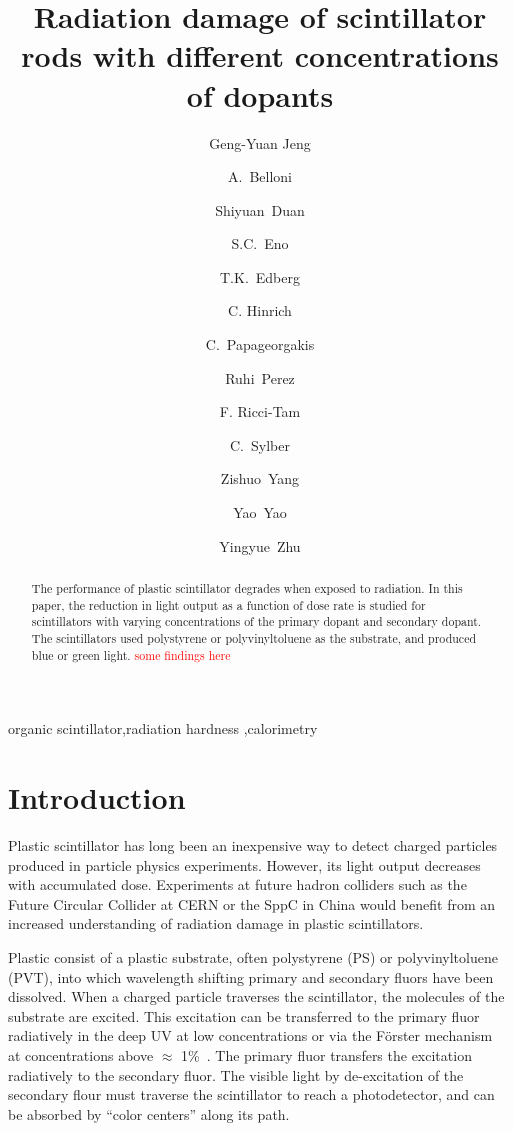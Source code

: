 \documentclass[review]{elsarticle}
\begin{document}
\begin{frontmatter}

\title{Radiation damage of scintillator rods with different concentrations of dopants
}


\author[umd]{Geng-Yuan Jeng}
\author[umd]{A.~Belloni}
\author[umd]{Shiyuan~Duan}
\author[umd]{S.C.~Eno}
\author[umd]{T.K.~Edberg}
\author[umd]{C. Hinrich}
\author[umd]{C.~Papageorgakis}
\author[umd]{Ruhi~Perez}
\author[umd]{F. Ricci-Tam}
\author[umd]{C.~Sylber}
\author[umd]{Zishuo~Yang}
\author[umd]{Yao~Yao}
\author[umd]{Yingyue~Zhu}

\address[umd]{Dept. Physics, U. Maryland, College Park MD 30742 USA}



\begin{abstract}
The performance of plastic scintillator degrades when exposed to radiation. 
In this paper, the reduction in light output  as a function of dose rate
is studied for scintillators
with varying concentrations of the primary dopant and secondary dopant.
The scintillators used polystyrene or polyvinyltoluene as the substrate, and
produced blue or green light. \textcolor{red}{some findings here}
\end{abstract}

\begin{keyword}
organic scintillator\sep radiation hardness \sep calorimetry
\end{keyword}

\end{frontmatter}

\linenumbers

\section{Introduction}
Plastic scintillator has long been an inexpensive way to detect 
charged particles produced in particle physics experiments.  
However, its 
light output decreases with accumulated dose.  
Experiments at future hadron colliders such as the Future Circular Collider at CERN\cite{fcc}
or the SppC in China\cite{sppc} would benefit from an increased understanding
of radiation damage in plastic scintillators.


Plastic consist of a plastic substrate, 
often polystyrene (PS) or polyvinyltoluene (PVT),
into which wavelength 
shifting primary and secondary fluors have been dissolved.
When a charged particle traverses the scintillator, the molecules of the substrate are excited.  
This excitation can be transferred to the primary fluor radiatively in the deep UV at low concentrations or via the F{\"o}rster 
mechanism~\cite{forster} at concentrations above $\approx$ 1\%~\cite{birks}.  
The primary fluor transfers the excitation radiatively to the secondary fluor.  
The visible light by de-excitation of the secondary flour
must traverse the scintillator to reach a photodetector, and can be absorbed by ``color centers'' along its path.
\end{document}
